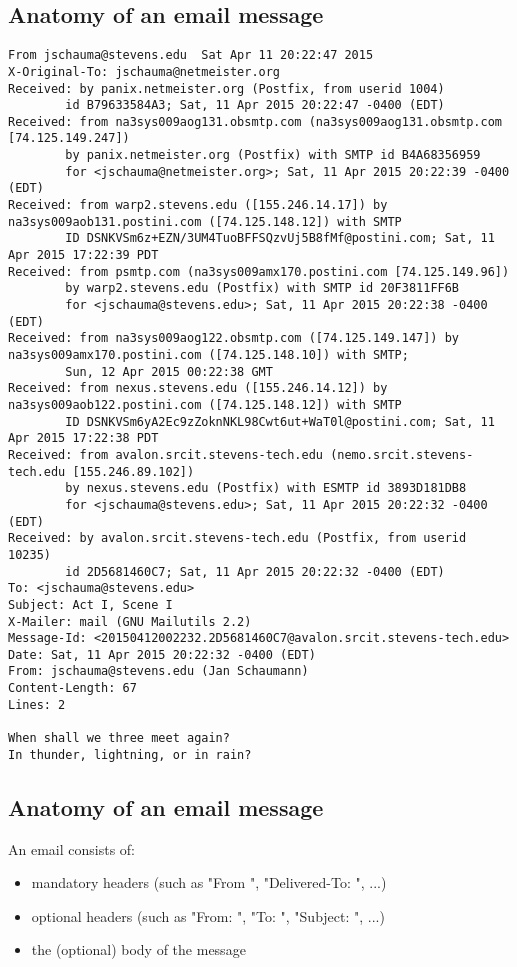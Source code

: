 \documentclass[xga]{xdvislides}
\begin{document}
\subsection{Anatomy of an email message}
\small
\begin{verbatim}
From jschauma@stevens.edu  Sat Apr 11 20:22:47 2015
X-Original-To: jschauma@netmeister.org
Received: by panix.netmeister.org (Postfix, from userid 1004)
        id B79633584A3; Sat, 11 Apr 2015 20:22:47 -0400 (EDT)
Received: from na3sys009aog131.obsmtp.com (na3sys009aog131.obsmtp.com [74.125.149.247])
        by panix.netmeister.org (Postfix) with SMTP id B4A68356959
        for <jschauma@netmeister.org>; Sat, 11 Apr 2015 20:22:39 -0400 (EDT)
Received: from warp2.stevens.edu ([155.246.14.17]) by na3sys009aob131.postini.com ([74.125.148.12]) with SMTP
        ID DSNKVSm6z+EZN/3UM4TuoBFFSQzvUj5B8fMf@postini.com; Sat, 11 Apr 2015 17:22:39 PDT
Received: from psmtp.com (na3sys009amx170.postini.com [74.125.149.96])
        by warp2.stevens.edu (Postfix) with SMTP id 20F3811FF6B
        for <jschauma@stevens.edu>; Sat, 11 Apr 2015 20:22:38 -0400 (EDT)
Received: from na3sys009aog122.obsmtp.com ([74.125.149.147]) by na3sys009amx170.postini.com ([74.125.148.10]) with SMTP;
        Sun, 12 Apr 2015 00:22:38 GMT
Received: from nexus.stevens.edu ([155.246.14.12]) by na3sys009aob122.postini.com ([74.125.148.12]) with SMTP
        ID DSNKVSm6yA2Ec9zZoknNKL98Cwt6ut+WaT0l@postini.com; Sat, 11 Apr 2015 17:22:38 PDT
Received: from avalon.srcit.stevens-tech.edu (nemo.srcit.stevens-tech.edu [155.246.89.102])
        by nexus.stevens.edu (Postfix) with ESMTP id 3893D181DB8
        for <jschauma@stevens.edu>; Sat, 11 Apr 2015 20:22:32 -0400 (EDT)
Received: by avalon.srcit.stevens-tech.edu (Postfix, from userid 10235)
        id 2D5681460C7; Sat, 11 Apr 2015 20:22:32 -0400 (EDT)
To: <jschauma@stevens.edu>
Subject: Act I, Scene I
X-Mailer: mail (GNU Mailutils 2.2)
Message-Id: <20150412002232.2D5681460C7@avalon.srcit.stevens-tech.edu>
Date: Sat, 11 Apr 2015 20:22:32 -0400 (EDT)
From: jschauma@stevens.edu (Jan Schaumann)
Content-Length: 67
Lines: 2

When shall we three meet again?
In thunder, lightning, or in rain?
\end{verbatim}
\Normalsize

\subsection{Anatomy of an email message}
An email consists of:
\begin{itemize}
	\item mandatory headers (such as "From ", "Delivered-To: ", ...)
	\item optional headers (such as "From: ", "To: ", "Subject: ", ...)
	\item the (optional) body of the message
\end{itemize}
\end{document}
